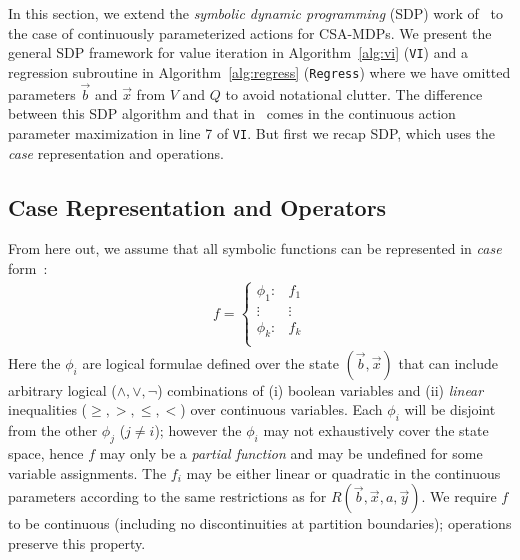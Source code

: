 \label{sec:sdp}

In this section, we extend the \emph{symbolic dynamic programming}
(SDP) work of~\cite{sanner_uai11} to the case of continuously
parameterized actions for CSA-MDPs.  We present the general SDP
framework for value iteration in Algorithm~\ref{alg:vi} (\texttt{VI})
and a regression subroutine in Algorithm~\ref{alg:regress}
(\texttt{Regress}) where we have omitted parameters $\vec{b}$ and
$\vec{x}$ from $V$ and $Q$ to avoid notational clutter.  The
difference between this SDP algorithm and that in~\cite{sanner_uai11}
comes in the continuous action parameter maximization in line 7 of
\texttt{VI}.
But first we recap SDP,
which uses the \emph{case} representation and operations.

\subsection{Case Representation and Operators}

From here out, we assume that all symbolic functions
can be represented in \emph{case} form~\cite{fomdp}:
{%
\begin{align}
f = 
\begin{cases}
  \phi_1: & f_1 \\ 
 \vdots&\vdots\\ 
  \phi_k: & f_k \\ 
\end{cases} \label{eq:case}
\end{align}
}
Here the $\phi_i$ are logical formulae defined over the state
$(\vec{b},\vec{x})$ that can include arbitrary logical ($\land,\lor,\neg$)
combinations of (i) boolean variables and (ii) 
\emph{linear} inequalities ($\geq,>,\leq,<$) 
over continuous variables.  
Each $\phi_i$ will be disjoint from the other $\phi_j$ ($j \neq i$); 
however the $\phi_i$ may not exhaustively cover the state space, hence
$f$ may only be a \emph{partial function} and may be undefined for some
variable assignments.
The $f_i$ may be either linear or quadratic in the continuous parameters
according to the same restrictions as for 
$R(\vec{b},\vec{x},a,\vec{y})$.  
We require $f$ to be continuous 
(including no discontinuities at partition boundaries); 
operations preserve this property.



